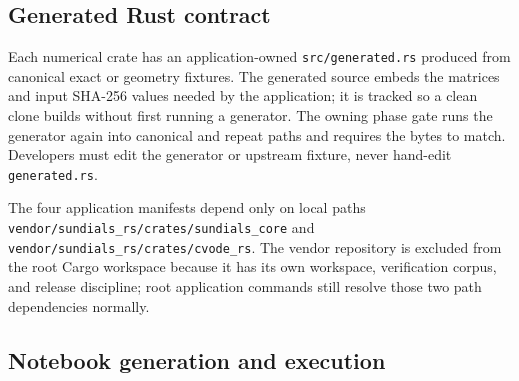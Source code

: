\documentclass[11pt]{article}
\begin{document}
\subsection{Generated Rust contract}

Each numerical crate has an application-owned \texttt{src/gene\allowbreak{}rated.rs} produced from canonical exact or geometry fixtures. The generated source embeds the matrices and input SHA-256 values needed by the application; it is tracked so a clean clone builds without first running a generator. The owning phase gate runs the generator again into canonical and repeat paths and requires the bytes to match. Developers must edit the generator or upstream fixture, never hand-edit \texttt{generate\allowbreak{}d.rs}.

The four application manifests depend only on local paths \texttt{vendor/s\allowbreak{}undials\_\allowbreak{}rs/crate\allowbreak{}s/sundia\allowbreak{}ls\_core} and \texttt{vendor/s\allowbreak{}undials\_\allowbreak{}rs/crate\allowbreak{}s/cvode\_\allowbreak{}rs}. The vendor repository is excluded from the root Cargo workspace because it has its own workspace, verification corpus, and release discipline; root application commands still resolve those two path dependencies normally.

\subsection{Notebook generation and execution}
\end{document}
